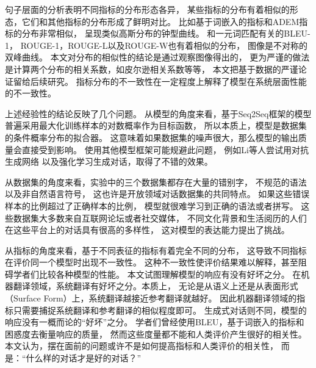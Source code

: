 句子层面的分析表明不同指标的分布形态各异，
某些指标的分布有着相似的形态，它们和其他指标的分布形成了鲜明对比。
比如基于词嵌入的指标和ADEM指标的分布非常相似，
呈现类似高斯分布的钟型曲线。
和一元词匹配有关的BLEU-1， ROUGE-1，ROUGE-L以及ROUGE-W也有着相似的分布，
图像是不对称的双峰曲线。
本文对分布的相似性的结论是通过观察图像得出的，
更为严谨的做法是计算两个分布的相关系数，如皮尔逊相关系数等等，
本文把基于数据的严谨论证留给后续研究。
指标分布的不一致性在一定程度上解释了模型在系统层面性能的不一致性。

上述经验性的结论反映了几个问题。
从模型的角度来看，基于Seq2Seq框架的模型普遍采用最大化训练样本的对数概率作为目标函数，
所以本质上，模型是数据集的条件概率分布的拟合器。
这意味着如果数据集的噪声很大，那么模型的输出质量会直接受到影响。
使用其他模型框架可能规避此问题，
例如Li等人尝试用对抗生成网络
以及强化学习生成对话，取得了不错的效果。

从数据集的角度来看，实验中的三个数据集都存在大量的错别字，
不规范的语法以及非自然语言符号，
这也许是开放领域对话数据集的共同特点。
如果这些错误样本的比例超过了正确样本的比例，
模型就很难学习到正确的语法或者拼写。
这些数据集大多数来自互联网论坛或者社交媒体，
不同文化背景和生活阅历的人们在这些平台上的对话具有很高的多样性，
这对模型的表达能力提出了挑战。

从指标的角度来看，基于不同表征的指标有着完全不同的分布，
这导致不同指标在评价同一个模型时出现不一致性。
这种不一致性使评价结果难以解释，甚至阻碍学者们比较各种模型的性能。
本文试图理解模型的响应有没有好坏之分。
在机器翻译领域，系统翻译有好坏之分。本质上，
无论是从语义上还是从表面形式（Surface Form）上，系统翻译越接近参考翻译就越好。
因此机器翻译领域的指标只需要捕捉系统翻译和参考翻译的相似程度即可。
生成式对话则不同，模型的响应没有一概而论的“好坏”之分。
学者们曾经使用BLEU，基于词嵌入的指标和
困惑度去衡量响应的质量，
然而这些度量都不能和人类评价产生很好的相关性。
本文认为，摆在面前的问题或许不是如何提高指标和人类评价的相关性，
而是：“什么样的对话才是好的对话？”
